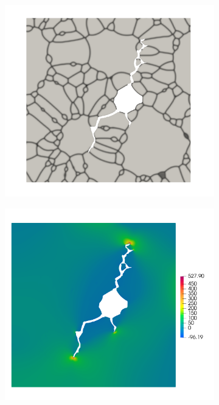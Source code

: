 \begin{frame}
\begin{columns}[T]
\begin{column}{0.4\textwidth}
\begin{figure}
        \begin{subfigure}[t]{0.47\linewidth}
          \centering
          \includegraphics[width=0.9\linewidth]{Chapter345/figures/partial_hbs_2}
        \end{subfigure}
        \begin{subfigure}[t]{0.47\linewidth}
          \centering
          \includegraphics[width=0.9\linewidth]{Chapter345/figures/partial_hbs_2_stress}
        \end{subfigure}
        

\end{figure}
\end{column}
\end{columns}
\end{frame}
